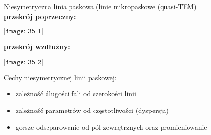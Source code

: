 \begin{solution}
	Niesymetryczna linia paskowa (linie mikropaskowe (quasi-TEM)\\
	\textbf{przekrój poprzeczny:}\\
	\begin{center}
    $\texttt{[image: 35\_1]}$\\
    \end{center}
	\textbf{przekrój wzdłużny:}\\
	\begin{center}
    $\texttt{[image: 35\_2]}$\\
    \end{center}
	Cechy niesymetrycznej linii paskowej:
	\begin{itemize}
	\item zależność dlugości fali od szerokości linii
	\item zależność parametrów od częstotliwości (dyspersja)
	\item gorsze odseparowanie od pól zewnętrznych oraz promieniowanie	
	\end{itemize}
\end{solution}
